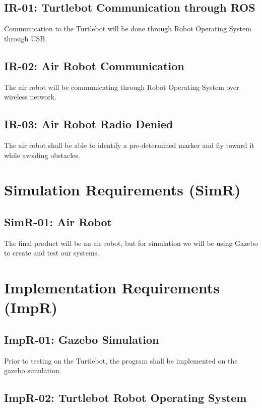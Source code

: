 \documentclass[]{report}
\begin{document}
\subsection{IR-01: Turtlebot Communication through ROS}

Communication to the Turtlebot will be done through Robot Operating System through USB.

\subsection{IR-02: Air Robot Communication}

The air robot will be communicating through Robot Operating System over wireless network.

\subsection{IR-03: Air Robot Radio Denied}

The air robot shall be able to identify a pre-determined marker and fly toward it while avoiding obstacles.


\section{Simulation Requirements (SimR)}

\subsection{SimR-01: Air Robot}
The final product will be an air robot, but for simulation we will be using Gazebo to create and test our systems. 


\section{Implementation Requirements (ImpR)}

\subsection{ImpR-01: Gazebo Simulation}

Prior to testing on the Turtlebot, the program shall be implemented on the gazebo simulation.

\subsection{ImpR-02: Turtlebot Robot Operating System}
\end{document}
